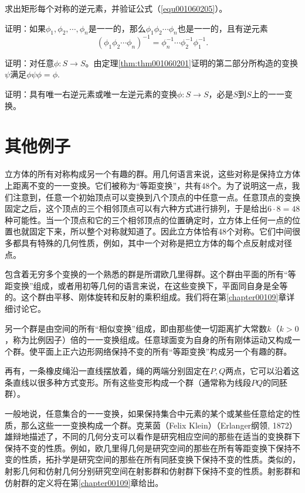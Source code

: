 \begin{problemset}
\item 求出矩形每个对称的逆元素，并验证公式（\ref{equ001060205}）。

\item 证明：如果$\phi_1,\phi_2,\cdots, \phi_n$是一一的，那么$\phi_1\phi_2\cdots\phi_n$也是一一的，且有逆元素
\[
(\phi_1\phi_2\cdots\phi_n)^{-1} = \phi_n^{-1}\cdots\phi_2^{-1}\phi_1^{-1}.
\]

\item 证明：对任意$\phi:S \to S$。由定理\ref{thm:thm001060201}证明的第二部分所构造的变换$\psi$满足$\phi\psi\phi = \phi$.

\item 证明：具有唯一右逆元素或唯一左逆元素的变换$\phi:S \to S$，必是$S$到$S$上的一一变换。


\end{problemset}


\section{其他例子}\label{section0010603}
立方体的所有对称构成另一个有趣的群。用几何语言来说，这些对称是保持立方体上距离不变的一一变换。它们被称为“等距变换”，共有48个。为了说明这一点，我们注意到，任意一个初始顶点可以变换到八个顶点的中任意一点。任意顶点的变换固定之后，这个顶点的三个相邻顶点可以有六种方式进行排列，于是给出$6 \cdot 8 = 48$种可能性。当一个顶点和它的三个相邻顶点的位置确定时，立方体上任何一点的位置也就固定下来，所以整个对称就知道了。因此立方体恰有48个对称。它们中间很多都具有特殊的几何性质，例如，其中一个对称是把立方体的每个点反射成对径点。

包含着无穷多个变换的一个熟悉的群是所谓欧几里得群。这个群由平面的所有“等距变换”组成，或者用初等几何的语言来说，在这些变换下，平面同自身是全等的。这个群由平移、刚体旋转和反射的乘积组成。我们将在第\ref{chapter00109}章详细讨论它。

另一个群是由空间的所有“相似变换”组成，即由那些使一切距离扩大常数$k$（$k>0$，称为比例因子）倍的一一变换组成。任意球面变为自身的所有刚体运动又构成一个群。使平面上正六边形网络保持不变的所有“等距变换”构成另一个有趣的群。

再有，一条橡皮绳沿一直线摆放着，绳的两端分别固定在$P,Q$两点，它可以沿着这条直线以很多种方式变形。所有这些变形构成一个群（通常称为线段$PQ$的同胚群）。

一般地说，任意集合的一一变换，如果保持集合中元素的某个或某些任意给定的性质，那么这些一一变换构成一个群。克莱茵（Felix Klein）（Erlanger纲领, 1872）雄辩地描述了，不同的几何分支可以看作是研究相应空间的那些在适当的变换群下保持不变的性质。例如，欧几里得几何是研究空间的那些在所有等距变换下保持不变的性质，拓扑学是研究空间的那些在所有同胚变换下保持不变的性质。类似的，射影几何和仿射几何分别研究空间在射影群和仿射群下保持不变的性质。射影群和仿射群的定义将在第\ref{chapter00109}章给出。

